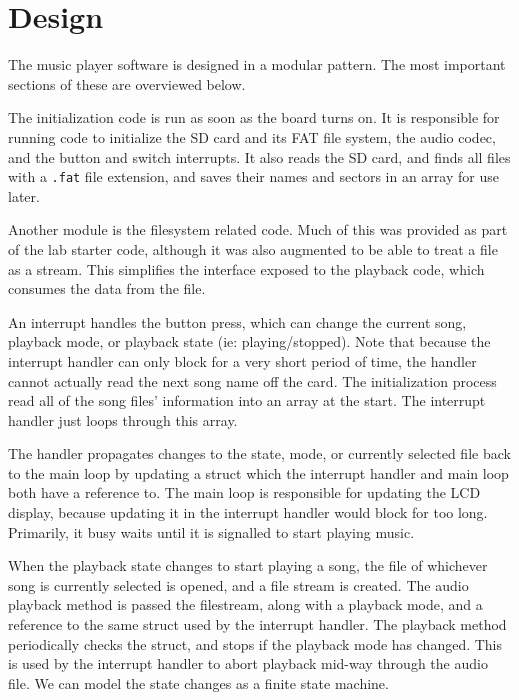 \documentclass[12pt]{article}
\begin{document}
\doublespacing

\section{Design}


The music player software is designed in a modular pattern.
The most important sections of these are overviewed below.

The initialization code is run as soon as the board turns on.
It is responsible for running code to initialize the SD card and its FAT file
system, the audio codec, and the button and switch interrupts.
It also reads the SD card, and finds all files with a \texttt{.fat} file
extension, and saves their names and sectors in an array for use later.

Another module is the filesystem related code.
Much of this was provided as part of the lab starter code, although it was also
augmented to be able to treat a file as a stream.
This simplifies the interface exposed to the playback code, which consumes the
data from the file.

An interrupt handles the button press, which can change the current song,
playback mode, or playback state (ie: playing/stopped).
Note that because the interrupt handler can only block for a very short period
of time, the handler cannot actually read the next song name off the card.
The initialization process read all of the song files' information into an
array at the start.
The interrupt handler just loops through this array.

The handler propagates changes to the state, mode, or currently selected file
back to the main loop by updating a struct which the interrupt handler and main
loop both have a reference to.
The main loop is responsible for updating the LCD display, because updating it
in the interrupt handler would block for too long.
Primarily, it busy waits until it is signalled to start playing music.

When the playback state changes to start playing a song, the file of whichever
song is currently selected is opened, and a file stream is created.
The audio playback method is passed the filestream, along with a playback mode,
and a reference to the same struct used by the interrupt handler.
The playback method periodically checks the struct, and stops if the playback
mode has changed.
This is used by the interrupt handler to abort playback mid-way through the audio
file.
We can model the state changes as a finite state machine.
\end{document}
